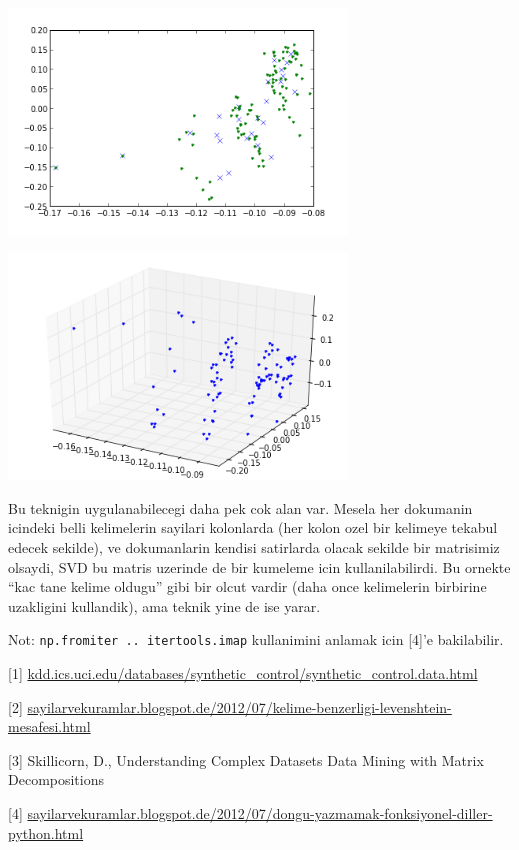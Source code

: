 \documentclass[12pt,fleqn]{article}\usepackage{../common}
\begin{document}
\includegraphics[height=6cm]{svd_5.png}

\includegraphics[height=6cm]{svd_6.png}


Bu teknigin uygulanabilecegi daha pek cok alan var. Mesela her dokumanin
icindeki belli kelimelerin sayilari kolonlarda (her kolon ozel bir kelimeye
tekabul edecek sekilde), ve dokumanlarin kendisi satirlarda olacak sekilde
bir matrisimiz olsaydi, SVD bu matris uzerinde de bir kumeleme icin
kullanilabilirdi. Bu ornekte ``kac tane kelime oldugu'' gibi bir olcut
vardir (daha once kelimelerin birbirine uzakligini kullandik), ama teknik
yine de ise yarar.

Not: \verb!np.fromiter .. itertools.imap! kullanimini anlamak
icin [4]'e bakilabilir.

[1] \url{kdd.ics.uci.edu/databases/synthetic_control/synthetic_control.data.html}

[2] \url{sayilarvekuramlar.blogspot.de/2012/07/kelime-benzerligi-levenshtein-mesafesi.html}

[3] Skillicorn, D., Understanding Complex Datasets Data Mining with Matrix Decompositions

[4] \url{sayilarvekuramlar.blogspot.de/2012/07/dongu-yazmamak-fonksiyonel-diller-python.html}
\end{document}
